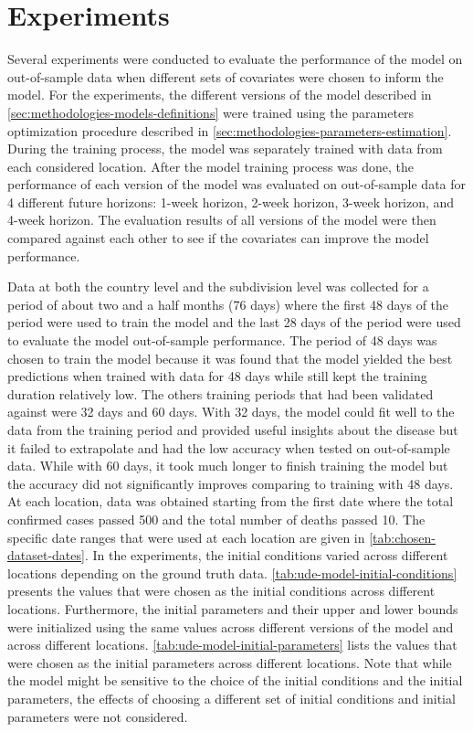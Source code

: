 \section{Experiments}
\label{sec:methodologies-experiments}

Several experiments were conducted to evaluate the performance of the model on out-of-sample data when different sets of covariates were chosen to inform the model.
For the experiments, the different versions of the model described in \autoref{sec:methodologies-models-definitions} were trained using the parameters optimization procedure described in \autoref{sec:methodologies-parameters-estimation}.
During the training process, the model was separately trained with data from each considered location.
After the model training process was done, the performance of each version of the model was evaluated on out-of-sample data for 4 different future horizons: 1-week horizon, 2-week horizon, 3-week horizon, and 4-week horizon.
The evaluation results of all versions of the model were then compared against each other to see if the covariates can improve the model performance.

Data at both the country level and the subdivision level was collected for a period of about two and a half months (76 days) where the first 48 days of the period were used to train the model and the last 28 days of the period were used to evaluate the model out-of-sample performance.
The period of 48 days was chosen to train the model because it was found that the model yielded the best predictions when trained with data for 48 days while still kept the training duration relatively low.
The others training periods that had been validated against were 32 days and 60 days.
With 32 days, the model could fit well to the data from the training period and provided useful insights about the disease but it failed to extrapolate and had the low accuracy when tested on out-of-sample data.
While with 60 days, it took much longer to finish training the model but the accuracy did not significantly improves comparing to training with 48 days.
At each location, data was obtained starting from the first date where the total confirmed cases passed 500 and the total number of deaths passed 10.
The specific date ranges that were used at each location are given in \autoref{tab:chosen-dataset-dates}.
In the experiments, the initial conditions varied across different locations depending on the ground truth data.
\autoref{tab:ude-model-initial-conditions} presents the values that were chosen as the initial conditions across different locations.
Furthermore, the initial parameters and their upper and lower bounds were initialized using the same values across different versions of the model and across different locations.
\autoref{tab:ude-model-initial-parameters} lists the values that were chosen as the initial parameters across different locations.
Note that while the model might be sensitive to the choice of the initial conditions and the initial parameters, the effects of choosing a different set of initial conditions and initial parameters were not considered.

